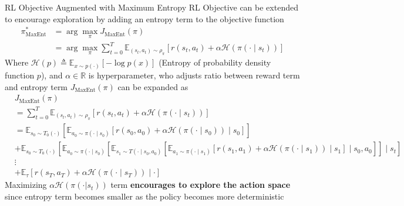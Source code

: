 \documentclass[8pt]{beamer}
\begin{document}
\begin{frame}{RL Objective Augmented with Maximum Entropy}
    RL Objective can be extended to encourage exploration by adding an entropy term to the objective function
    \[
    \begin{aligned}
        \pi_{\text{MaxEnt}}^\ast &= \arg \max_{\pi} J_{\text{MaxEnt}}(\pi) \\
        &= \arg \max_{\pi} \sum_{t=0}^T \mathbb{E}_{(s_t, a_t) \sim \rho_\pi}[r(s_t, a_t) + \alpha \mathcal{H}(\pi(\cdot \mid s_t))]
    \end{aligned}
    \]
    Where \( \mathcal{H}(p) \triangleq \mathbb{E}_{x \sim p(\cdot)}[- \log{p(x)}] \) (Entropy of probability density function $p$),\newline
    and $\alpha \in \mathbb{R}$ is hyperparameter, who adjusts ratio between reward term and entropy term
    $J_{\text{MaxEnt}}(\pi)$ can be expanded as
    \[
    \begin{aligned}
        &J_{\text{MaxEnt}}(\pi)\\ &= \sum_{t=0}^T \mathbb{E}_{(s_t,a_t) \sim \rho_\pi} [r(s_t, a_t) + \alpha \mathcal{H} (\pi(\cdot \mid s_t))] \\
        &= \mathbb{E}_{s_0 \sim T_0(\cdot)}[\mathbb{E}_{a_0 \sim \pi(\cdot \mid s_0)}[r(s_0, a_0) + \alpha \mathcal{H}(\pi(\cdot \mid s_0)) \mid s_0]] \\
        &+ \mathbb{E}_{s_0 \sim T_0(\cdot)}[\mathbb{E}_{a_0 \sim \pi(\cdot \mid s_0)}[\mathbb{E}_{s_1 \sim T(\cdot \mid s_0, a_0)}[\mathbb{E}_{a_1 \sim \pi(\cdot \mid s_1)}[r(s_1, a_1) +\alpha \mathcal{H}(\pi(\cdot \mid s_1)) \mid s_1] \mid s_0, a_0]] \mid s_t]\\
        &\vdots \\
        &+ \mathbb{E}_{\tau} [ r(s_T, a_T) + \alpha \mathcal{H}(\pi(\cdot \mid s_T)) \mid \cdot]
    \end{aligned}
    \]
    Maximizing $\alpha \mathcal{H}(\pi(\cdot|s_t))$ term \textbf{encourages to explore the action space} since entropy term becomes smaller as the policy becomes more deterministic
\end{frame}
\end{document}
